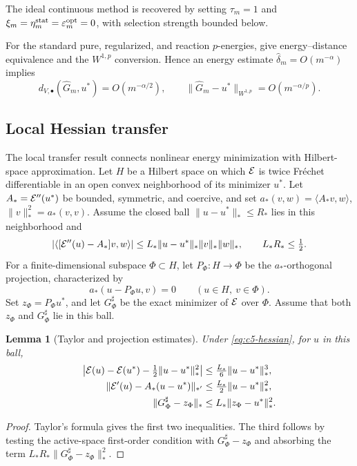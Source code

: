 \documentclass[11pt]{article}
\newtheorem{lemma}[theorem]{Lemma}
\theoremstyle{remark}\newtheorem{remark}[theorem]{Remark}
\begin{document}
The ideal continuous method is recovered by setting
$\tau_m=1$ and
$\xi_m=\eta_m^{\rm stat}=\varepsilon_m^{\rm opt}=0$,
with selection strength bounded below.

For the standard pure, regularized, and reaction $p$-energies,
\CGAEnergyMetricReference{} give energy--distance equivalence
and the $W^{1,p}$ conversion. Hence an energy estimate
$\widehat\delta_m=O(m^{-\alpha})$ implies
\[
  d_{V,\bullet}(\widehat G_m,u^*)=O(m^{-\alpha/2}),\qquad
  \|\widehat G_m-u^*\|_{W^{1,p}}=O(m^{-\alpha/p}).
\]

\subsection{Local Hessian transfer}
\label{sec:c5-hessian}

The local transfer result connects nonlinear energy minimization with Hilbert-space approximation. Let $H$ be a
Hilbert space on which $\mathcal E$ is twice Fr\'echet differentiable in an open
convex neighborhood of its minimizer $u^*$. Let $A_*=\mathcal E''(u^*)$ be bounded,
symmetric, and coercive, and set
$a_*(v,w)=\langle A_*v,w\rangle$, $\|v\|_*^2=a_*(v,v)$.
Assume the closed ball $\|u-u^*\|_*\le R_*$ lies in this neighborhood and
\begin{equation}
 |\langle[\mathcal E''(u)-A_*]v,w\rangle|
 \le L_*\|u-u^*\|_*\|v\|_*\|w\|_*,\qquad L_*R_*\le\tfrac12 .
 \label{eq:c5-hessian}
\end{equation}
For a finite-dimensional subspace $\Phi\subset H$, let
$P_\Phi:H\to\Phi$ be the $a_*$-orthogonal projection, characterized by
\[
  a_*(u-P_\Phi u,v)=0
  \qquad (u\in H,\ v\in\Phi).
\]
Set $z_\Phi=P_\Phi u^*$, and let $G_\Phi^\sharp$ be the exact
minimizer of $\mathcal E$ over $\Phi$.
Assume that both $z_\Phi$ and $G_\Phi^\sharp$ lie in this ball.

\begin{lemma}[Taylor and projection estimates]
\label{lem:c5-projection}
Under \eqref{eq:c5-hessian}, for $u$ in this ball,
\begin{align}
 \left|\mathcal E(u)-\mathcal E(u^*)-\tfrac12\|u-u^*\|_*^2\right|&\le\tfrac{L_*}{6}\|u-u^*\|_*^3,\\
 \|\mathcal E'(u)-A_*(u-u^*)\|_{*'}&\le\tfrac{L_*}{2}\|u-u^*\|_*^2,\\
 \|G_\Phi^\sharp-z_\Phi\|_*&\le L_*\|z_\Phi-u^*\|_*^2.
 \label{eq:c5-proj}
\end{align}
\end{lemma}
\begin{proof}
Taylor's formula gives the first two inequalities.  The third follows by testing the active-space first-order condition with $G_\Phi^\sharp-z_\Phi$ and absorbing the term $L_*R_*\|G_\Phi^\sharp-z_\Phi\|_*^2$.
\end{proof}
\end{document}
